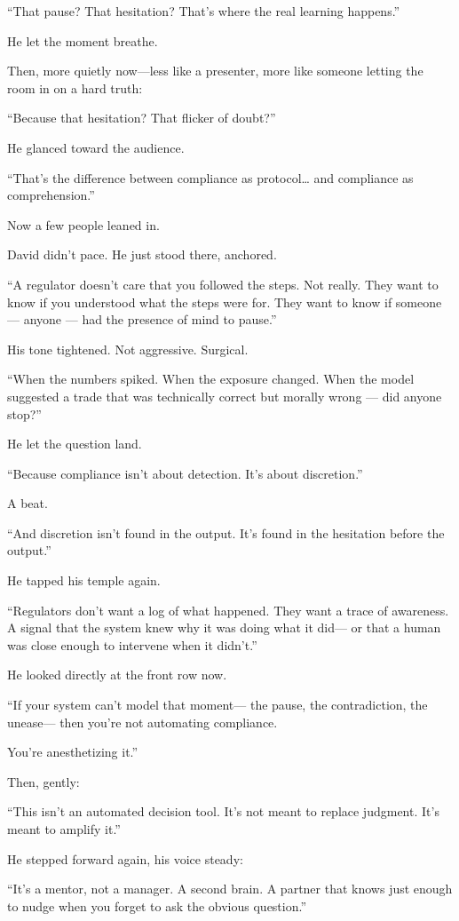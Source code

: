 ``That pause? That hesitation? That’s where the real learning happens.''

He let the moment breathe.

Then, more quietly now—less like a presenter, more like someone letting the room in on a hard truth:

“Because that hesitation? That flicker of doubt?”

He glanced toward the audience.

“That’s the difference between compliance as protocol… and compliance as comprehension.”

Now a few people leaned in.

David didn’t pace. He just stood there, anchored.

“A regulator doesn’t care that you followed the steps. Not really.
They want to know if you understood what the steps were for.
They want to know if someone — anyone — had the presence of mind to pause.”

His tone tightened. Not aggressive. Surgical.

“When the numbers spiked.
When the exposure changed.
When the model suggested a trade that was technically correct but morally wrong —
did anyone stop?”

He let the question land.

“Because compliance isn’t about detection.
It’s about discretion.”

A beat.

“And discretion isn’t found in the output.
It’s found in the hesitation before the output.”

He tapped his temple again.

“Regulators don’t want a log of what happened.
They want a trace of awareness.
A signal that the system knew why it was doing what it did—
or that a human was close enough to intervene when it didn’t.”

He looked directly at the front row now.

“If your system can’t model that moment—
the pause, the contradiction, the unease—
then you’re not automating compliance.

You’re anesthetizing it.”

Then, gently:

“This isn’t an automated decision tool.
It’s not meant to replace judgment.
It’s meant to amplify it.”

He stepped forward again, his voice steady:

“It’s a mentor, not a manager.
A second brain.
A partner that knows just enough to nudge when you forget to ask the obvious question.”

